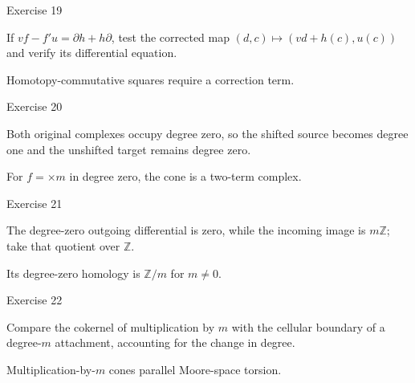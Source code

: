 \begin{exercise}\label{exr:viii24-19}
Exercise 19
\end{exercise}
\begin{hint}
If \(vf-f'u=\partial h+h\partial\), test the corrected map \((d,c)\mapsto(vd+h(c),u(c))\) and verify its differential equation.
\end{hint}
\begin{solution}
Homotopy-commutative squares require a correction term.
\end{solution}

\begin{exercise}\label{exr:viii24-20}
Exercise 20
\end{exercise}
\begin{hint}
Both original complexes occupy degree zero, so the shifted source becomes degree one and the unshifted target remains degree zero.
\end{hint}
\begin{solution}
For \(f=\times m\) in degree zero, the cone is a two-term complex.
\end{solution}

\begin{exercise}\label{exr:viii24-21}
Exercise 21
\end{exercise}
\begin{hint}
The degree-zero outgoing differential is zero, while the incoming image is \(m\mathbb Z\); take that quotient over \(\mathbb Z\).
\end{hint}
\begin{solution}
Its degree-zero homology is \(\mathbb Z/m\) for \(m\ne0\).
\end{solution}

\begin{exercise}\label{exr:viii24-22}
Exercise 22
\end{exercise}
\begin{hint}
Compare the cokernel of multiplication by \(m\) with the cellular boundary of a degree-\(m\) attachment, accounting for the change in degree.
\end{hint}
\begin{solution}
Multiplication-by-\(m\) cones parallel Moore-space torsion.
\end{solution}

